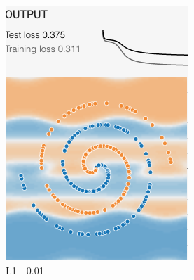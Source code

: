 \documentclass[12pt,a4paper]{article}
\begin{document}
\begin{enumerate}
\begin{figure}[H]
\begin{subfigure}[H]{0.2\textwidth}
				\includegraphics[width=\textwidth]{Figures/reg/L001}
				\caption{L1 - 0.01}
			\end{subfigure}
			\begin{subfigure}[H]{0.2\textwidth}
				\centering

\end{subfigure}
\end{figure}
\end{enumerate}
\end{document}
